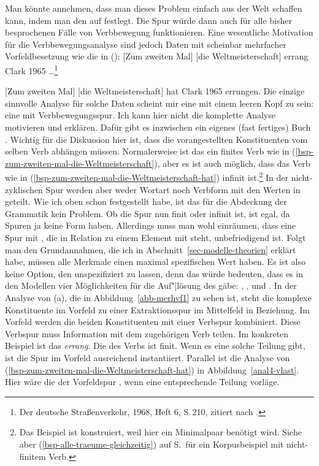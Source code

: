 Man könnte annehmen, dass man dieses Problem einfach aus der Welt schaffen kann, indem man den
\vformw auf  festlegt. Die Spur würde dann auch für alle bisher besprochenen Fälle von
Verbbewegung funktionieren. Eine wesentliche Motivation für die Verbbewegungsanalyse sind jedoch Daten mit scheinbar
mehrfacher Vorfeldbesetzung wie die in ():
\eal
\ex {}[Zum zweiten Mal] [die Weltmeisterschaft] errang Clark 1965 \ldots\footnote{%
        Der deutsche Straßenverkehr, 1968, Heft 6, S.\,210, zitiert nach \citet*[]{Neumann69a-u}.
      }\label{bsp-zum-zweiten-mal-die-Weltmeisterschaft}

\ex
\label{bsp-zum-zweiten-mal-die-Weltmeisterschaft-hat}
{}[Zum zweiten Mal] [die Weltmeisterschaft] hat Clark 1965 errungen.
\zl
Die einzige sinnvolle Analyse für solche Daten scheint mir eine mit einem leeren Kopf zu sein: eine mit
Verbbewegungsspur. Ich kann hier nicht die komplette Analyse motivieren und erklären. Dafür gibt es
inzwischen ein eigenes (fast fertiges) Buch \citep{MuellerGS}. Wichtig für die Diskussion hier ist,
dass die vorangestellten Konstituenten vom selben Verb abhängen müssen. Normalerweise ist das ein
finites Verb wie in (\ref{bsp-zum-zweiten-mal-die-Weltmeisterschaft}), aber es ist auch möglich,
dass das Verb wie in (\ref{bsp-zum-zweiten-mal-die-Weltmeisterschaft-hat}) infinit ist.\footnote{%
  Das Beispiel ist konstruiert, weil hier ein Minimalpaar benötigt wird. Siehe aber
  (\ref{bsp-alle-traeume-gleichzeitig}) auf S.\,\pageref{bsp-alle-traeume-gleichzeitig} für ein
  Korpusbeispiel mit nicht-finitem Verb.
} In der
nicht-zyklischen Spur werden aber weder Wortart noch Verbform mit den Werten in \dsl geteilt. Wie
ich oben schon festgestellt habe, ist das für die Abdeckung der Grammatik kein Problem. Ob die Spur
nun finit oder infinit ist, ist egal, da Spuren ja keine Form haben. Allerdings muss man wohl
einräumen, dass eine Spur mit \vform {}, die in Relation zu einem Element mit \vformw
{} steht, unbefriedigend ist. Folgt man den Grundannahmen, die ich in Abschnitt~\ref{sec-modelle-theorien} erklärt
habe, müssen alle Merkmale einen maximal spezifischen Wert haben. Es ist also keine Option, den
\vformw unspezifiziert zu lassen, denn das würde bedeuten, dass es in den Modellen vier
Möglichkeiten für die Auf"|lösung des \vformwes gäbe: , ,  und
. In der Analyse von (a), die in Abbildung~\ref{abb-merhvf1} zu sehen ist, steht
die komplexe Konstituente im Vorfeld  zu einer Extraktionsspur im Mittelfeld in
Beziehung. Im Vorfeld werden die beiden Konstituenten mit einer Verbspur kombiniert. Diese Verbspur
muss Information mit dem zugehörigen Verb teilen. Im konkreten Beispiel ist das \emph{errang}. Die
\vform des Verbs ist finit. Wenn es eine solche Teilung gibt, ist die Spur im Vorfeld ausreichend instantiiert.
Parallel ist die Analyse von (\ref{bsp-zum-zweiten-mal-die-Weltmeisterschaft-hat}) in
Abbildung~\ref{anal4-vlast}. Hier wäre die \vform der Vorfeldspur , wenn eine entsprechende Teilung vorläge.

